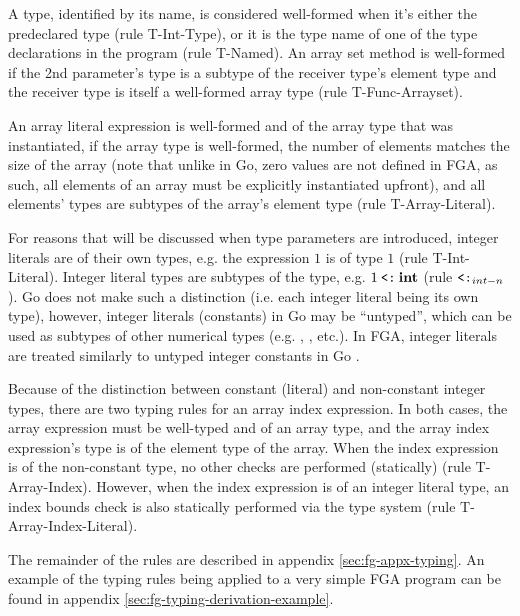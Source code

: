 A type, identified by its name, is considered well-formed when it's either the
predeclared  type (rule T-Int-Type), or it is the type name of one of
the type declarations in the program (rule T-Named). An array set method is
well-formed if the 2nd parameter's type is a subtype of the receiver type's
element type and the receiver type is itself a well-formed array type (rule
T-Func-Arrayset).

An array literal expression is well-formed and of the array type that was
instantiated, if the array type is well-formed, the number of elements matches
the size of the array (note that unlike in Go, zero values are not defined in
FGA, as such, all elements of an array must be explicitly instantiated upfront),
and all elements' types are subtypes of the array's element type (rule
T-Array-Literal).

For reasons that will be discussed when type parameters are introduced, integer
literals are of their own types, e.g. the expression $1$ is of type $1$ (rule
T-Int-Literal). Integer literal types are subtypes of the  type, e.g. $1
    \mathbin{\texttt{<:}} \texttt{\bf int}$ (rule $\mathbin{\texttt{<:}}_{int-n}$). Go does not make such a distinction (i.e.
each integer literal being its own type), however, integer literals (constants)
in Go may be ``untyped'', which can be used as subtypes of other numerical types
(e.g. , ,  etc.). In FGA, integer literals are
treated similarly to untyped integer constants in Go \autocite{spec}.

Because of the distinction between constant (literal) and non-constant integer
types, there are two typing rules for an array index expression. In both cases,
the array expression must be well-typed and of an array type, and the array
index expression's type is of the element type of the array. When the index
expression is of the non-constant  type, no other checks are performed
(statically) (rule T-Array-Index). However, when the index expression is of an
integer literal type, an index bounds check is also statically performed via the
type system (rule T-Array-Index-Literal).

The remainder of the rules are described in appendix \ref{sec:fg-appx-typing}.
An example of the typing rules being applied to a very simple FGA program can be
found in appendix \ref{sec:fg-typing-derivation-example}.




